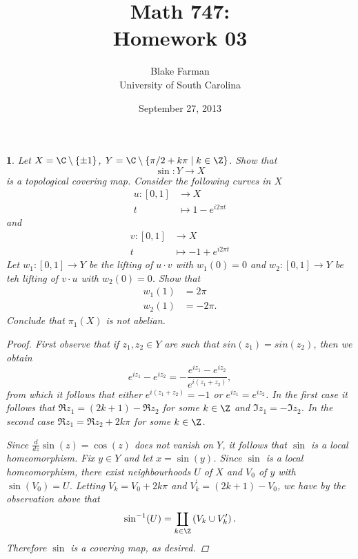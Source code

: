 \documentclass[10pt]{amsart}
\author{Blake Farman\\University of South Carolina}
\title{Math 747:\\Homework 03}
\date{September 27, 2013}
\begin{document}
\maketitle

\providecommand{\p}{\mathfrak{p}}
\providecommand{\m}{\mathfrak{m}}

\newtheorem{thm}{}
\newtheorem{lem}{Lemma}
\newtheorem{prop}{Proposition}
\theoremstyle{definition}
\newtheorem{defn}{Definition}[thm]

\newcommand{\A}{\mathbb{A}}

\begin{thm}
  Let $X = \C \setminus \left\{ \pm 1\right\}$, $Y = \C \setminus \left\{\pi/2 + k\pi \;\middle\vert\; k \in \Z\right\}$.
  Show that 
  $$\sin \colon Y \rightarrow X$$
  is a topological covering map.
  Consider the following curves in $X$
  \begin{align*}
    u \colon [0,1] &\rightarrow X\\
    t &\mapsto 1 - e^{i2\pi t}
  \end{align*}
  and
  \begin{align*}
    v \colon [0,1] &\rightarrow X\\
    t &\mapsto -1 + e^{i2\pi t}
  \end{align*} 
  Let $w_1 \colon [0,1] \rightarrow Y$ be the lifting of $u \cdot v$ with $w_1(0) = 0$ and $w_2 \colon [0,1] \rightarrow Y$ be teh lifting of $v \cdot u$ with $w_2(0) = 0$.
  Show that
  \begin{align*}
    w_1(1) &= 2\pi\\
    w_2(1) &= -2\pi.
  \end{align*}
  Conclude that $\pi_1(X)$ is not abelian.

  \begin{proof}
    First observe that if $z_1, z_2 \in Y$ are such that $sin(z_1) = sin(z_2)$, then we obtain 
    $$e^{iz_1} - e^{iz_2} = -\frac{e^{iz_1} - e^{iz_2}}{e^{i(z_1 + z_2)}},$$
    from which it follows that either $e^{i(z_1 + z_2)} = -1$ or $e^{iz_1} = e^{iz_2}$.
    In the first case it follows that $\Re{z_1} = (2k + 1) - \Re{z_2}$ for some $k \in \Z$ and $\Im{z_1} = -\Im{z_2}$.
    In the second case $\Re{z_1} = \Re{z_2} + 2k\pi$ for some $k \in \Z$.
    
    Since $\frac{d}{dz} \sin(z) = \cos(z)$ does not vanish on $Y$, it follows that $\sin$ is a local homeomorphism.
    Fix $y \in Y$ and let $x = \sin(y)$.
    Since $\sin$ is a local homeomorphism, there exist neighbourhoods $U$ of $X$ and $V_0$ of $y$ with $\sin(V_0) = U$.
    Letting $V_k = V_0 + 2k\pi$ and $V_k^\prime = (2k + 1) - V_0$, we have by the observation above that
    $$\sin^{-1}(U) = \coprod_{k \in \Z} \left( V_k \cup V_k^\prime \right).$$
    Therefore $\sin$ is a covering map, as desired.


\end{proof}
\end{thm}
\end{document}
